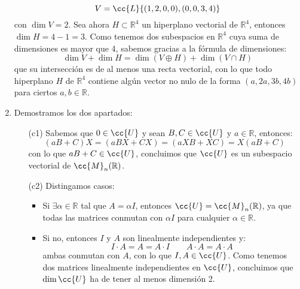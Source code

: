 \documentclass[12pt]{article}
\begin{document}
\begin{ejercicio}
\begin{enumerate}[label=\alph*)]
\begin{equation*}
                    V = \cc{L}\{(1,2,0,0),(0,0,3,4)\}
                \end{equation*}
                con $\dim V = 2$. Sea ahora $H\subset\mathbb{R}^4$ un hiperplano vectorial de $\mathbb{R}^4$, entonces $\dim H = 4-1=3$. Como tenemos dos subespacios en $\mathbb{R}^4$ cuya suma de dimensiones es mayor que 4, sabemos gracias a la fórmula de dimensiones:
                \begin{equation*}
                    \dim V + \dim H = \dim(V \oplus H) + \dim(V\cap H)
                \end{equation*}
                que su intersección es de al menos una recta vectorial, con lo que todo hiperplano $H$ de $\mathbb{R}^4$ contiene algún vector no nulo de la forma $(a,2a,3b,4b)$ para ciertos $a,b\in \mathbb{R}$.
            \item Demostramos los dos apartados:
                \begin{enumerate}
                    \item[(c1)] Sabemos que $0\in \cc{U}$ y sean $B,C\in \cc{U}$ y $a\in \mathbb{R}$, entonces:
                        \begin{equation*}
                            (aB+C) X = (aBX + CX) = (aXB + XC) = X(aB + C)
                        \end{equation*}
                        con lo que $aB+C\in \cc{U}$, concluimos que $\cc{U}$ es un subespacio vectorial de $\cc{M}_n(\mathbb{R})$.
                    \item[(c2)] Distingamos casos:
                        \begin{itemize}
                            \item Si $\exists \alpha\in \mathbb{R}$ tal que $A = \alpha I$, entonces $\cc{U}=\cc{M}_n(\mathbb{R})$, ya que todas las matrices conmutan con $\alpha I$ para cualquier $\alpha\in \mathbb{R}$.
                            \item Si no, entonces $I$ y $A$ son linealmente independientes y:
                                \begin{equation*}
                                    I\cdot A = A = A\cdot I \qquad A\cdot A = A\cdot A
                                \end{equation*}
                                ambas conmutan con $A$, con lo que $I,A\in \cc{U}$. Como tenemos dos matrices linealmente independientes en $\cc{U}$, concluimos que $\dim \cc{U}$ ha de tener al menos dimensión 2.
                        \end{itemize}
                \end{enumerate}
        \end{enumerate}
    \end{ejercicio}
\end{document}
